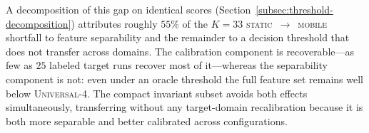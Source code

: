 A decomposition of this gap on identical scores
(Section~\ref{subsec:threshold-decomposition}) attributes roughly $55\%$ of the
$K=33$ \textsc{static}~$\rightarrow$~\textsc{mobile} shortfall to feature
separability and the remainder to a decision threshold that does not transfer
across domains. The calibration component is recoverable---as few as $25$ labeled
target runs recover most of it---whereas the separability component is not: even
under an oracle threshold the full feature set remains well below
\textsc{Universal-4}. The compact invariant subset avoids both effects
simultaneously, transferring without any target-domain recalibration because it is
both more separable and better calibrated across configurations.

